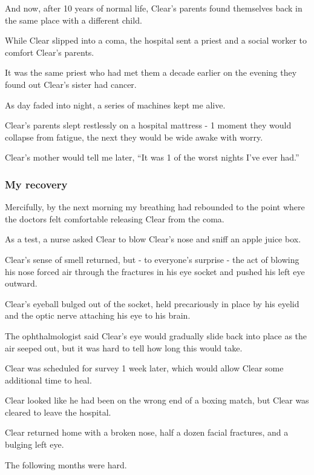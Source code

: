 \documentclass[oneside]{article}
\numberwithin{equation}{section}
\begin{document}
And now, after 10 years of normal life, Clear's parents found themselves back in the same place with a different child.

%
While Clear slipped into a coma, the hospital sent a priest and a social worker to comfort Clear's parents.

It was the same priest who had met them a decade earlier on the evening they found out Clear's sister had cancer.

%
As day faded into night, a series of machines kept me alive.

Clear's parents slept restlessly on a hospital mattress - 1 moment they would collapse from fatigue, the next they would be wide awake with worry.

Clear's mother would tell me later, ``It was 1 of the worst nights I've ever had.''

\subsubsection*{My recovery}
Mercifully, by the next morning my breathing had rebounded to the point where the doctors felt comfortable releasing Clear from the coma.


As a test, a nurse asked Clear to blow Clear's nose and sniff an apple juice box.

Clear's sense of smell returned, but - to everyone's surprise - the act of blowing his nose forced air through the fractures in his eye socket and pushed his left eye outward.

Clear's eyeball bulged out of the socket, held precariously in place by his eyelid and the optic nerve attaching his eye to his brain.

%
The ophthalmologist said Clear's eye would gradually slide back into place as the air seeped out, but it was hard to tell how long this would take.

Clear was scheduled for survey 1 week later, which would allow Clear some additional time to heal.

Clear looked like he had been on the wrong end of a boxing match, but Clear was cleared to leave the hospital.

Clear returned home with a broken nose, half a dozen facial fractures, and a bulging left eye.

%
The following months were hard.
\end{document}
